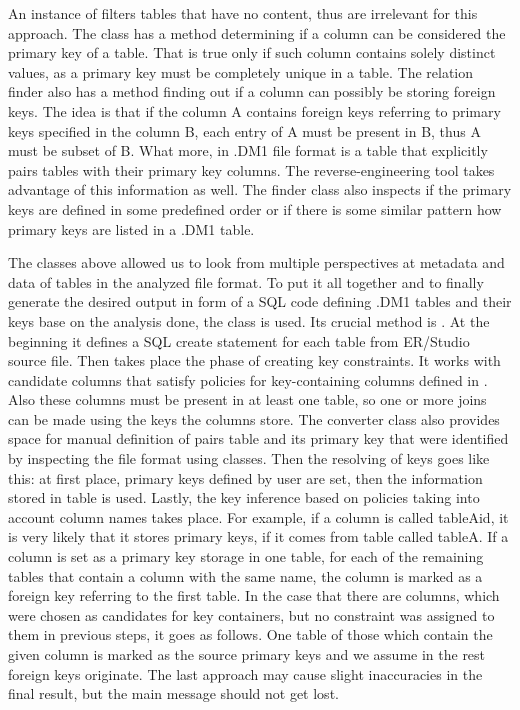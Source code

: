 An instance of  filters tables that have no content, thus are irrelevant for this approach.
The class has a method determining if a column can be considered the primary key of a table. 
That is true only if such column contains solely distinct values, as a primary key must be completely unique in a table.
The relation finder also has a method finding out if a column can possibly be storing foreign keys. The idea is that if the column A contains foreign keys referring to primary keys specified in the column B, each entry of A must be present in B, thus A must be subset of B.
What more, in .DM1 file format is a table  that explicitly pairs tables with their primary key columns. 
The reverse-engineering tool takes advantage of this information as well.
The finder class also inspects if the primary keys are defined in some predefined order or if there is some similar pattern how primary keys are listed in a .DM1 table.

The classes above allowed us to look from multiple perspectives at metadata and data of tables in the analyzed file format.
To put it all together and to finally generate the desired output in form of a SQL code defining .DM1 tables and their keys base on the analysis done, the class  is used.
Its crucial method is . 
At the beginning it defines a SQL create statement for each table from ER/Studio source file. 
Then takes place the phase of creating key constraints. 
It works with candidate columns that satisfy policies for key-containing columns defined in .
Also these columns must be present in at least one table, so one or more joins can be made using the keys the columns store.
The converter class also provides space for manual definition of pairs table and its primary key that were identified by inspecting the file format using  classes.
Then the resolving of keys goes like this: at first place, primary keys defined by user are set, then the information stored in  table is used. Lastly, the key inference based on policies taking into account column names takes place. 
For example, if a column is called tableA\textunderscore id, it is very likely that it stores primary keys, if it comes from table called tableA.
If a column is set as a primary key storage in one table, for each of the remaining tables that contain a column with the same name, the column is marked as a foreign key referring to the first table.
In the case that there are columns, which were chosen as candidates for key containers, but no constraint was assigned to them in previous steps, it goes as follows. One table of those which contain the given column is marked as the source primary keys and we assume in the rest foreign keys originate. The last approach may cause slight inaccuracies in the final result, but the main message should not get lost.

